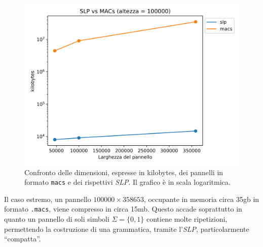 \begin{figure}
  \centering
  \includegraphics[scale = 0.6]{img/slp_vs_macs2.png}
  \caption{Confronto delle dimensioni, espresse in kilobytes, dei pannelli in
    formato \texttt{macs} e dei rispettivi \textit{SLP}. Il grafico è in scala
    logaritmica.}
  \label{fig:slpres2}
\end{figure}
Il caso estremo, un pannello $100000\times 358653$, occupante in memoria
circa 35gb in formato \texttt{.macs}, viene compresso in circa 15mb. Questo
accade soprattutto in quanto un pannello di soli simboli $\Sigma=\{0,1\}$
contiene molte ripetizioni, permettendo la costruzione di una grammatica,
tramite l'\textit{SLP}, particolarmente ``compatta''.
